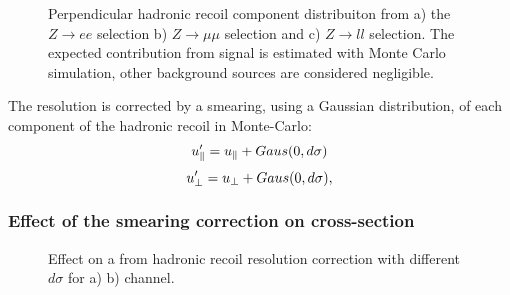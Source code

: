 \begin{figure}[!tbp]
\begin{minipage}[h]{0.32\linewidth}
\end{minipage}
\hfill
\begin{minipage}[h]{0.32\linewidth}
\end{minipage}
\hfill
\begin{minipage}[h]{0.32\linewidth}
\end{minipage}
\caption{Perpendicular hadronic recoil component distribuiton from a) the $Z\to ee$ selection b) $Z\to\mu\mu$ selection and c) $Z\to ll$ selection. The expected contribution from signal is estimated with Monte Carlo simulation, other background sources are considered negligible.}
\label{HadrRecoil:UpeprSmear}
\end{figure}

The resolution is corrected by a smearing, using a Gaussian distribution, of each component of the hadronic recoil in Monte-Carlo:
\begin{equation}
u_{\parallel}' = u_{\parallel}+Gaus(0, d\sigma)
\end{equation}
\begin{equation}
u_{\perp}' = u_{\perp} + Gaus(0, d\sigma),
\end{equation}

\subsubsection{Effect of the smearing correction on cross-section}

\begin{figure}[!tbp]
\begin{minipage}[h]{0.49\linewidth}
\end{minipage}
\hfill
\begin{minipage}[h]{0.49\linewidth}
\end{minipage}
\caption{Effect on a \cw from hadronic recoil resolution correction with different $d\sigma$ for a) \wenu b) \wmunu channel.}
\label{ris:HadrRecSmearScan}
\end{figure}

